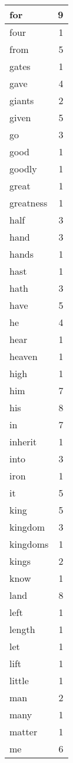 \begin{center}
\begin{longtable}{l|r}
for & 9 \\ \hline
four & 1 \\ \hline
from & 5 \\ \hline
gates & 1 \\ \hline
gave & 4 \\ \hline
giants & 2 \\ \hline
given & 5 \\ \hline
go & 3 \\ \hline
good & 1 \\ \hline
goodly & 1 \\ \hline
great & 1 \\ \hline
greatness & 1 \\ \hline
half & 3 \\ \hline
hand & 3 \\ \hline
hands & 1 \\ \hline
hast & 1 \\ \hline
hath & 3 \\ \hline
have & 5 \\ \hline
he & 4 \\ \hline
hear & 1 \\ \hline
heaven & 1 \\ \hline
high & 1 \\ \hline
him & 7 \\ \hline
his & 8 \\ \hline
in & 7 \\ \hline
inherit & 1 \\ \hline
into & 3 \\ \hline
iron & 1 \\ \hline
it & 5 \\ \hline
king & 5 \\ \hline
kingdom & 3 \\ \hline
kingdoms & 1 \\ \hline
kings & 2 \\ \hline
know & 1 \\ \hline
land & 8 \\ \hline
left & 1 \\ \hline
length & 1 \\ \hline
let & 1 \\ \hline
lift & 1 \\ \hline
little & 1 \\ \hline
man & 2 \\ \hline
many & 1 \\ \hline
matter & 1 \\ \hline
me & 6 \\ \hline

\end{longtable}
\end{center}
